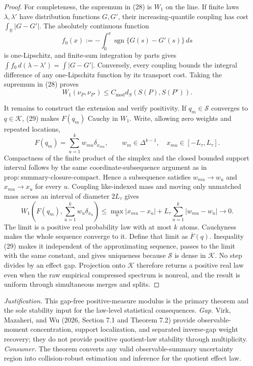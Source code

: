 \documentclass{article}
\begin{document}
\begin{proof}
For completeness, the supremum in (28) is \(W_1\) on the line.  If finite laws \(\lambda,\lambda'\) have distribution functions \(G,G'\), their increasing-quantile coupling has cost \(\int_{\mathbb R}|G-G'|\).  The absolutely continuous function
\[
f_0(x):=-\int_0^x\operatorname{sgn}\{G(s)-G'(s)\}\,ds
\]
is one-Lipschitz, and finite-sum integration by parts gives
\(\int f_0\,d(\lambda-\lambda')=\int|G-G'|\).  Conversely, every coupling bounds the integral difference of any one-Lipschitz function by its transport cost.  Taking the supremum in (28) proves
\[
W_1(\nu_P,\nu_{P'})\le C_{\mathrm{mod}}d_S(S(P),S(P')).                       \tag{29}
\]

It remains to construct the extension and verify positivity.  If \(q_m\in\mathscr S\) converges to \(q\in\mathcal K\), (29) makes \(F(q_m)\) Cauchy in \(W_1\).  Write, allowing zero weights and repeated locations,
\[
F(q_m)=\sum_{u=1}^kw_{mu}\delta_{x_{mu}},\qquad
w_m\in\Delta^{k-1},\quad x_{mu}\in[-L_{\tau},L_{\tau}].
\]
Compactness of the finite product of the simplex and the closed bounded support interval follows by the same coordinate-subsequence argument as in \(\mathrm{prop:summary\text{-}closure\text{-}compact}\).  Hence a subsequence satisfies \(w_{mu}\to w_u\) and \(x_{mu}\to x_u\) for every \(u\).  Coupling like-indexed mass and moving only unmatched mass across an interval of diameter \(2L_{\tau}\) gives
\[
W_1\!\left(F(q_m),\sum_{u=1}^kw_u\delta_{x_u}\right)
\le\max_u|x_{mu}-x_u|+L_{\tau}\sum_{u=1}^k|w_{mu}-w_u|\longrightarrow0.        \tag{30}
\]
The limit is a positive real probability law with at most \(k\) atoms.  Cauchyness makes the whole sequence converge to it.  Define that limit as \(\overline F(q)\).  Inequality (29) makes it independent of the approximating sequence, passes to the limit with the same constant, and gives uniqueness because \(\mathscr S\) is dense in \(\mathcal K\).  No step divides by an effect gap.  Projection onto \(\mathcal K\) therefore returns a positive real law even when the raw empirical compressed spectrum is nonreal, and the result is uniform through simultaneous merges and splits.
\end{proof}
\par\smallskip\noindent \textit{Justification.} This gap-free positive-measure modulus is the primary theorem and the sole stability input for the law-level statistical consequences. \textit{Gap.} Virk, Mazaheri, and Wu (2026, Section 7.1 and Theorem 7.2) provide observable-moment concentration, support localization, and separated inverse-gap weight recovery; they do not provide positive quotient-law stability through multiplicity. \textit{Consumer.} The theorem converts any valid observable-summary uncertainty region into collision-robust estimation and inference for the quotient effect law.
\end{document}
